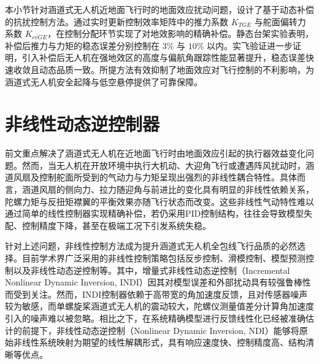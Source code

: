 



本小节针对涵道式无人机近地面飞行时的地面效应扰动问题，设计了基于动态补偿的抗扰控制方法。通过实时更新控制效率矩阵中的推力系数 \(K_{TGE}\) 与舵面偏转力系数 \(K_{cvGE}\)，在控制分配环节实现了对地效影响的精确补偿。静态台架实验表明，补偿后推力与力矩的稳态误差分别控制在 \(3\%\) 与 \(10\%\) 以内。实飞验证进一步证明，引入补偿后无人机在强地效区的高度与偏航角跟踪性能显著提升，稳态误差快速收敛且动态品质一致。所提方法有效抑制了地面效应对飞行控制的不利影响，为涵道式无人机安全起降与低空悬停提供了可靠保障。

\section{非线性动态逆控制器}

前文重点解决了涵道式无人机在近地面飞行时由地面效应引起的执行器效益变化问题。然而，当无人机在开放环境中执行大机动、大迎角飞行或遭遇阵风扰动时，涵道风扇及控制舵面所受到的气动力与力矩呈现出强烈的非线性耦合特性。具体而言，涵道风扇的侧向力、拉力随迎角与前进比的变化具有明显的非线性依赖关系，陀螺力矩与反扭矩襟翼的平衡效果亦随飞行状态而改变。这些非线性气动特性难以通过简单的线性控制器实现精确补偿，若仍采用PID控制结构，往往会导致模型失配、控制精度下降，甚至在极端工况下引发系统失稳。

针对上述问题，非线性控制方法成为提升涵道式无人机全包线飞行品质的必然选择。目前学术界广泛采用的非线性控制策略包括反步控制、滑模控制、模型预测控制以及非线性动态逆控制等。其中，增量式非线性动态逆控制（Incremental Nonlinear Dynamic Inversion, INDI）因其对模型误差和外部扰动具有较强鲁棒性而受到关注\cite{Cheng2024INDI}。然而，INDI控制器依赖于高带宽的角加速度反馈，且对传感器噪声较为敏感，而单螺旋桨涵道式无人机的震动较大，陀螺仪测量值差分计算角加速度引入的噪声难以被忽略。相比之下，在系统精确模型进行反馈线性化已经被准确估计的前提下，非线性动态逆控制（Nonlinear Dynamic Inversion, NDI）能够将原始非线性系统映射为期望的线性解耦形式，具有响应速度快、控制精度高、结构清晰等优点。

